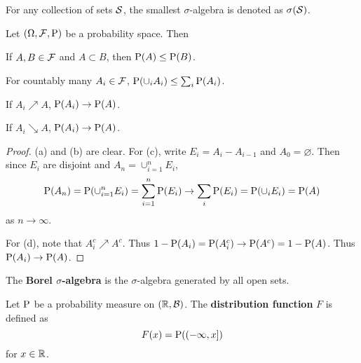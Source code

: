 \begin{definition}
    For any collection of sets $\S$, the smallest $\sigma$-algebra is denoted 
    as $\sigma(\S)$. 
\end{definition}

\begin{theorem}\label{thm:monotone_conv_measure}
    Let $(\Omega, \F, \P)$ be a probability space. Then 
    \begin{thmenum}
        \item If $A, B\in\F$ and $A\subset B$, then $\P(A)\leq\P(B)$. 
        \item For countably many $A_i\in\F$, $\P(\cup_i A_i)\leq \sum_i \P(A_i)$. 
        \item If $A_i\nearrow A$, $\P(A_i)\to \P(A)$. 
        \item If $A_i\searrow A$, $\P(A_i)\to \P(A)$. 
    \end{thmenum}
\end{theorem}
\begin{proof}
    (a) and (b) are clear. For (c), write $E_i = A_i - A_{i-1}$ and $A_0 = \varnothing$. 
    Then since $E_i$ are disjoint and $A_n = \cup_{i=1}^n E_i$, 
    \begin{equation*}
        \P(A_n) = \P\pth{\cup_{i=1}^n E_i} = \sum_{i=1}^n \P(E_i) 
        \to \sum_i \P(E_i) = \P(\cup_i E_i) = \P(A)
    \end{equation*}  
    as $n\to\infty$. 
    
    For (d), note that $A_i^c\nearrow A^c$. Thus $1 - \P(A_i) = \P(A_i^c)\to\P(A^c) = 1 - \P(A)$. 
    Thus $\P(A_i)\to\P(A)$.  
\end{proof}

\begin{definition}
    The \textbf{Borel $\sigma$-algebra} is the $\sigma$-algebra generated by all 
    open sets. 
\end{definition}

\begin{definition}
    Let $\P$ be a probability measure on $(\R, \B)$. The \textbf{distribution function} 
    $F$ is defined as 
    \begin{equation*}
        F(x) = \P((-\infty, x])
    \end{equation*}
    for $x\in\R$. 
\end{definition}

